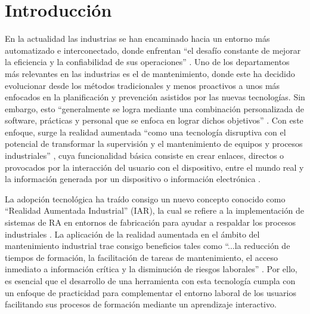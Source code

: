 \section*{Introducción}

    En la actualidad las industrias se han encaminado hacia un entorno más automatizado e interconectado, donde enfrentan “el desafío constante de mejorar la eficiencia y la confiabilidad de sus operaciones” \parencite[p. 64]{ALVAREZ:2024}. Uno de los departamentos más relevantes en las industrias es el de mantenimiento, donde este ha decidido evolucionar desde los métodos tradicionales y menos proactivos a unos más enfocados en la planificación y prevención asistidos por las nuevas tecnologías. Sin embargo, esto “generalmente se logra mediante una combinación personalizada de software, prácticas y personal que se enfoca en lograr dichos objetivos” \parencite[p. 12]{FCH:2021}. Con este enfoque, surge la realidad aumentada “como una tecnología disruptiva con el potencial de transformar la supervisión y el mantenimiento de equipos y procesos industriales” \parencite[p. 64]{ALVAREZ:2024}, cuya funcionalidad básica consiste en crear enlaces, directos o provocados por la interacción del usuario con el dispositivo, entre el mundo real y la información generada por un dispositivo o información electrónica \parencite{ARENAS:2022}. 

    La adopción tecnológica ha traído consigo un nuevo concepto conocido como “Realidad Aumentada Industrial” (IAR), la cual se refiere a la implementación de sistemas de RA en entornos de fabricación para ayudar a respaldar los procesos industriales \parencite{BONDIN:2022}. La aplicación de la realidad aumentada en el ámbito del mantenimiento industrial trae consigo beneficios tales como “...la reducción de tiempos de formación, la facilitación de tareas de mantenimiento, el acceso inmediato a información crítica y la disminución de riesgos laborales” \parencite[p. 76]{ALVAREZ:2024}. Por ello, es esencial que el desarrollo de una herramienta con esta tecnología cumpla con un enfoque de practicidad para complementar el entorno laboral de los usuarios facilitando sus procesos de formación mediante un aprendizaje interactivo.